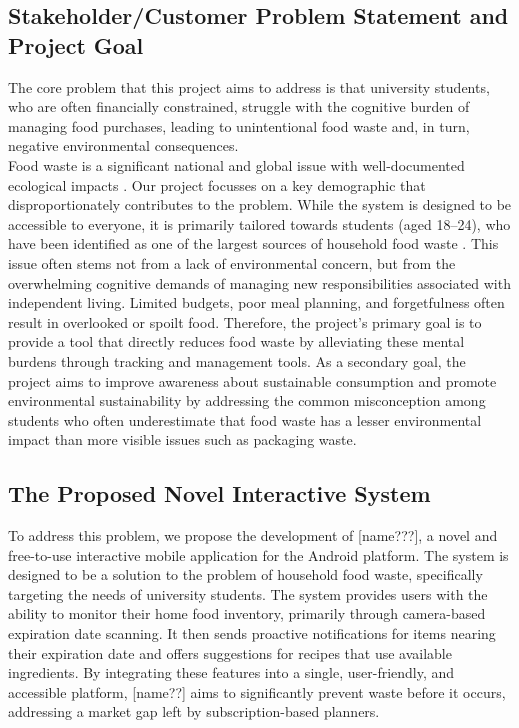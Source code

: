 \subsection{Stakeholder/Customer Problem Statement and Project Goal}
\par
The core problem that this project aims to address is that university students, who are often financially constrained, struggle with the cognitive burden of managing food purchases, leading to unintentional food waste and, in turn, negative environmental consequences.
\\
Food waste is a significant national and global issue with well-documented ecological impacts \cite{JeswaniExtentOfFoodWaste}. Our project focusses on a key demographic that disproportionately contributes to the problem. While the system is designed to be accessible to everyone, it is primarily tailored towards students (aged 18–24), who have been identified as one of the largest sources of household food waste \cite{WangWhatInfluencesFoodWaste}. This issue often stems not from a lack of environmental concern, but from the overwhelming cognitive demands of managing new responsibilities associated with independent living. Limited budgets, poor meal planning, and forgetfulness often result in overlooked or spoilt food. Therefore, the project's primary goal is to provide a tool that directly reduces food waste by alleviating these mental burdens through tracking and management tools. As a secondary goal, the project aims to improve awareness about sustainable consumption and promote environmental sustainability by addressing the common misconception among students who often underestimate that food waste has a lesser environmental impact than more visible issues such as packaging waste.


\subsection{The Proposed Novel Interactive System}
\par 
\noindent To address this problem, we propose the development of [name???], a novel and free-to-use interactive mobile application for the Android platform. The system is designed to be a solution to the problem of household food waste, specifically targeting the needs of university students. The system provides users with the ability to monitor their home food inventory, primarily through camera-based expiration date scanning. It then sends proactive notifications for items nearing their expiration date and offers suggestions for recipes that use available ingredients. By integrating these features into a single, user-friendly, and accessible platform, [name??] aims to significantly prevent waste before it occurs, addressing a market gap left by subscription-based planners.


